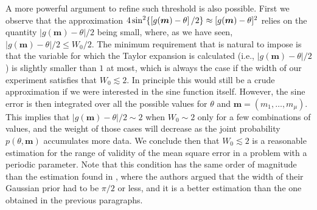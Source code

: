 A more powerful argument to refine such threshold is also possible. First we observe that the approximation $4\hspace{0.15em}\mathrm{sin}^2\lbrace\left[g(\boldsymbol{m})-\theta\right]/2 \rbrace \approx [g(\boldsymbol{m})-\theta]^2$ relies on the quantity $|g(\boldsymbol{m})-\theta|/2$ being small, where, as we have seen, $|g(\boldsymbol{m})-\theta|/2 \leqslant W_0/2$. The minimum requirement that is natural to impose is that the variable for which the Taylor expansion is calculated (i.e., $|g(\boldsymbol{m})-\theta|/2$) is slightly smaller than $1$ at most, which is always the case if the width of our experiment satisfies that $W_0 \lesssim 2$. In principle this would still be a crude approximation if we were interested in the sine function itself. However, the sine error is then integrated over all the possible values for $\theta$ and $\boldsymbol{m} = (m_1, \dots , m_\mu)$. This implies that $|g(\boldsymbol{m})-\theta|/2 \sim 2$ when $W_0\sim2$ only for a few combinations of values, and the weight of those cases will decrease as the joint probability $p(\theta,\boldsymbol{m})$ accumulates more data. We conclude then that $W_0 \lesssim 2$ is a reasonable estimation for the range of validity of the mean square error in a problem with a periodic parameter. Note that this condition has the same order of magnitude than the estimation found in \cite{friis2017}, where the authors argued that the width of their Gaussian prior had to be $\pi/2$ or less, and it is a better estimation than the one obtained in the previous paragraphs. 

